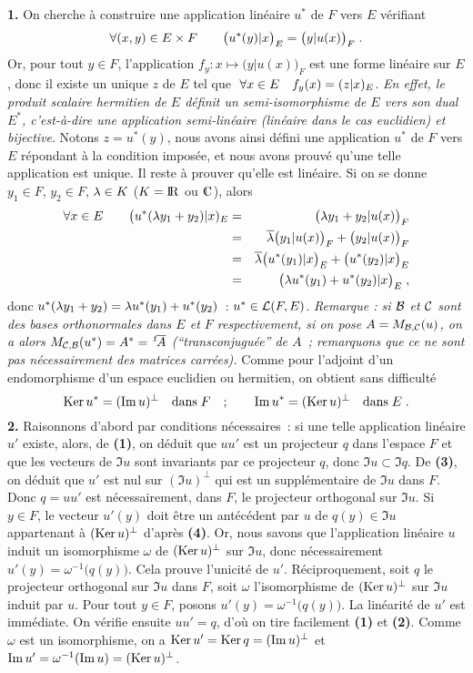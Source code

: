 \documentclass{article}
\begin{document}
{\bf 1.} On cherche \`a construire une application lin\'eaire $u^*$ de $F$ vers $E$ v\'erifiant\vv
$$\forall(x,y)\in E\times F\qquad \big(u^*(y)|x\big)_E=\big(y|u(x)\big)_F\;.$$
Or, pour tout $y\in F$, l'application $f_y:x\mapsto\big(y|u(x)\big)_F$ est une forme lin\'eaire sur $E$, donc il existe un unique $z$ de $E$ tel que $\;\forall x\in E\quad f_y(x)=(z|x)_E$. {\it En effet, le produit scalaire hermitien de $E$ d\'efinit un semi-isomorphisme de $E$ vers son dual $E^*$, c'est-\`a-dire une application semi-lin\'eaire (lin\'eaire dans le cas euclidien) et bijective}. Notons $z=u^*(y)$, nous avons ainsi d\'efini une application $u^*$ de $F$ vers $E$ r\'epondant \`a la condition impos\'ee, et nous avons prouv\'e qu'une telle application est unique. Il reste \`a prouver qu'elle est lin\'eaire. Si on se donne $y_1\in F$, $y_2\in F$, $\lambda\in K$ ($K={\rm I\kern-0.6mm R}$ ou $\cmat$), alors\vvvv
\begin{eqnarray*}
\forall x\in E\qquad \big(u^*(\lambda y_1+y_2)|x)_E & = & \big(\lambda y_1+y_2|u(x)\big)_F\\
                                                             & = & \overline{\lambda}\big(y_1|u(x)\big)_F+\big(y_2|u(x)\big)_F\\
         & = & \overline{\lambda}\big(u^*(y_1)|x\big)_E+\big(u^*(y_2)|x\big)_E\\
         & = & \big(\lambda u^*(y_1)+u^*(y_2)|x\big)_E\;,
\end{eqnarray*}
donc $u^*(\lambda y_1+y_2)=\lambda u^*(y_1)+u^*(y_2)$~: $u^*\in{\cal L}(F,E)$.\msk\sect
{\it Remarque : si ${\cal B}$ et ${\cal C}$ sont des bases orthonormales dans $E$ et $F$ respectivement, si on pose $A=M_{{\cal B},{\cal C}}(u)$, on a alors $M_{{\cal C},{\cal B}}(u^*)=A^*=\,{}^t\!\!\>\overline{A}$ (``transconjugu\'ee'' de $A$~; remarquons que ce ne sont pas n\'ecessairement des matrices carr\'ees).}\msk\sect
Comme pour l'adjoint d'un endomorphisme d'un espace euclidien ou hermitien, on obtient sans difficult\'e\vv
$$\mathop{\rm Ker}\nolimits u^*=(\mathop{\rm Im}\nolimits u)^\perp\quad{\rm dans}\;F\quad;\qquad \mathop{\rm Im}\nolimits u^*=(\mathop{\rm Ker}\nolimits u)^\perp\quad{\rm dans}\;E\;.$$
\ssk
{\bf 2.} Raisonnons d'abord par conditions n\'ecessaires~: si une telle application lin\'eaire $u'$ existe, alors, de {\bf (1)}, on d\'eduit que $uu'$ est un projecteur $q$ dans l'espace $F$ et que les vecteurs de $\Im u$ sont invariants par ce projecteur $q$, donc $\Im u\subset\Im q$. De {\bf (3)}, on d\'eduit que $u'$ est nul sur $(\Im u)^\perp$ qui est un suppl\'ementaire de $\Im u$ dans $F$. Donc $q=uu'$ est n\'ecessairement, dans $F$, le projecteur orthogonal sur $\Im u$. Si $y\in F$, le vecteur $u'(y)$ doit \^etre un ant\'ec\'edent par $u$ de $q(y)\in\Im u$ appartenant \`a $(\mathop{\rm Ker}\nolimits u)^\perp$ d'apr\`es {\bf (4)}. Or, nous savons que l'application lin\'eaire $u$ induit un isomorphisme $\omega$ de $(\mathop{\rm Ker}\nolimits u)^\perp$ sur $\Im u$, donc n\'ecessairement $u'(y)=\omega^{-1}\big(q(y)\big)$. Cela prouve l'unicit\'e de $u'$.\msk\sect
R\'eciproquement, soit $q$ le projecteur orthogonal sur $\Im u$ dans $F$, soit $\omega$ l'isomorphisme de $(\mathop{\rm Ker}\nolimits u)^\perp$ sur $\Im u$ induit par $u$. Pour tout $y\in F$, posons $u'(y)=\omega^{-1}\big(q(y)\big)$. La lin\'earit\'e de $u'$ est imm\'ediate. On v\'erifie ensuite $uu'=q$, d'o\`u on tire facilement {\bf (1)} et {\bf (2)}. Comme $\omega$ est un isomorphisme, on a $\mathop{\rm Ker}\nolimits u'=\mathop{\rm Ker}\nolimits q=(\mathop{\rm Im}\nolimits u)^\perp$ et $\mathop{\rm Im}\nolimits u'=\omega^{-1}(\mathop{\rm Im}\nolimits u)=(\mathop{\rm Ker}\nolimits u)^\perp$.
\end{document}
